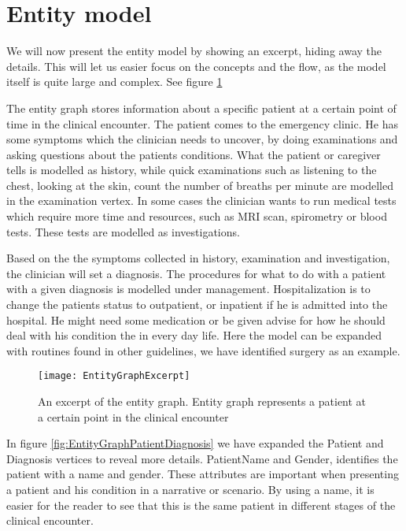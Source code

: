 \section{Entity model}
We will now present the entity model by showing an excerpt, hiding away the details. This will let us easier focus on the concepts and the flow, as the model itself is quite large and complex. See figure \ref{fig:EntityGraphExcerpt}

The entity graph stores information about a specific patient at a certain point of time in the clinical encounter. The patient comes to the emergency clinic. He has some symptoms which the clinician needs to uncover, by doing examinations and asking questions about the patients conditions. What the patient or caregiver tells is modelled as history, while quick examinations such as listening to the chest, looking at the skin, count the number of breaths per minute are modelled in the examination vertex. In some cases the clinician wants to run medical tests which require more time and resources, such as MRI scan, spirometry or blood tests. These tests are modelled as investigations.

Based on the the symptoms collected in history, examination and investigation, the clinician will set a diagnosis. The procedures for what to do with a patient with a given diagnosis is modelled under management. Hospitalization is to change the patients status to outpatient, or inpatient if he is admitted into the hospital. He might need some medication or be given advise for how he should deal with his condition the in every day life. Here the model can be expanded with routines found in other guidelines, we have identified surgery as an example. 

\begin{figure}[h!]
	\texttt{[image: EntityGraphExcerpt]}
	\caption {An excerpt of the entity graph. Entity graph represents a patient at a certain point in the clinical encounter}
	\label{fig:EntityGraphExcerpt}
\end{figure}

In figure \ref{fig:EntityGraphPatientDiagnosis} we have expanded the Patient and Diagnosis vertices to reveal more details. PatientName and Gender, identifies the patient with a name and gender. These attributes are important when presenting a patient and his condition in a narrative or scenario. By using a name, it is easier for the reader to see that this is the same patient in different stages of the clinical encounter.

